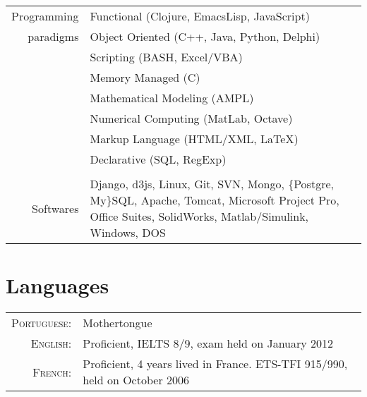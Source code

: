 \documentclass[a4paper,10pt]{article} %
\begin{document}
\begin{tabular}{rp{11cm}}
Programming & Functional (Clojure, EmacsLisp, JavaScript)\\
paradigms & Object Oriented (C++, Java, Python, Delphi)\\
& Scripting (BASH, Excel/VBA)\\
& Memory Managed (C)\\
& Mathematical Modeling (AMPL) \\
& Numerical Computing (MatLab, Octave) \\
& Markup Language (HTML/XML, LaTeX) \\
& Declarative (SQL, RegExp) \\

&\\

Softwares & Django, d3js, Linux, Git, SVN, Mongo, \{Postgre, My\}SQL,
Apache, Tomcat, Microsoft Project Pro, Office Suites, SolidWorks,
Matlab/Simulink, Windows, DOS \\




\end{tabular}


\section{Languages}

\begin{tabular}{rl}
\textsc{Portuguese:} & Mothertongue\\

\textsc{English:} & Proficient, IELTS 8/9, exam held on January 2012\\

\textsc{French:} & Proficient, 4 years lived in France. ETS-TFI
915/990, held on October 2006\\



\end{tabular}
\end{document}
